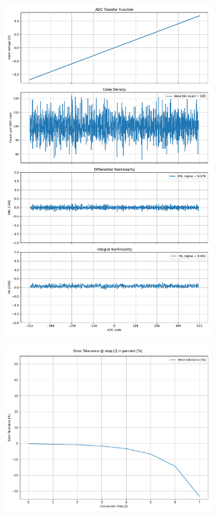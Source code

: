 \documentclass[varwidth]{standalone}
\begin{document}
\begin{figure}
\begin{subfigure}{0.32\textwidth}
    \includegraphics[width=\textwidth]{behavioral_10b_mismatch_nonlinearity.pdf}
\end{subfigure}
\begin{subfigure}{0.32\textwidth}
    \includegraphics[width=\textwidth]{behavioral_10b_mismatch_redundancy.pdf}

\end{subfigure}
\end{figure}
\end{document}
